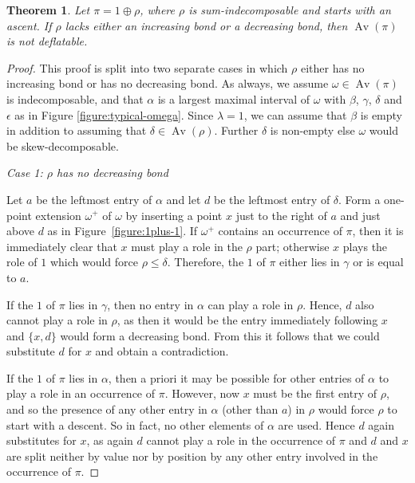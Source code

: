 \documentclass[10pt]{article}
\theoremstyle{plain}
\newtheorem{theorem}{Theorem}[section]
\newcommand{\Av}{\operatorname{Av}}
\begin{document}
\begin{theorem}
	\label{theorem:bonds-inc}
	Let $\pi = 1 \oplus \rho$, where $\rho$ is sum-indecomposable and starts with an ascent. If $\rho$ lacks either an increasing bond or a decreasing bond, then $\Av(\pi)$ is not deflatable.
\end{theorem}
\begin{proof}
	This proof is split into two separate cases in which $\rho$ either has no increasing bond or has no decreasing bond. As always, we assume $\omega \in \Av(\pi)$ is indecomposable, and that $\alpha$ is a largest maximal interval of $\omega$ with $\beta$, $\gamma$, $\delta$ and $\epsilon$ as in Figure \ref{figure:typical-omega}. Since $\lambda = 1$, we can assume that $\beta$ is empty in addition to assuming that $\delta \in \Av(\rho)$. Further $\delta$ is non-empty else $\omega$ would be skew-decomposable. 
	
	\bigskip
	
	\emph{Case 1: $\rho$ has no decreasing bond}
	
	Let $a$ be the leftmost entry of $\alpha$ and let $d$ be the leftmost entry of $\delta$. Form a one-point extension $\omega^+$ of $\omega$ by inserting a point $x$ just to the right of $a$ and just above $d$ as in Figure~\ref{figure:1plus-1}. If $\omega^+$ contains an occurrence of $\pi$, then it is immediately clear that $x$ must play a role in the $\rho$ part; otherwise $x$ plays the role of $1$ which would force $\rho \leq \delta$. Therefore, the $1$ of $\pi$ either lies in $\gamma$ or is equal to $a$.
	
	If the $1$ of $\pi$ lies in $\gamma$, then no entry in $\alpha$ can play a role in $\rho$. Hence, $d$ also cannot play a role in $\rho$, as then it would be the entry immediately following $x$ and $\{x,d\}$ would form a decreasing bond. From this it follows that we could substitute $d$ for $x$ and obtain a contradiction.
	
	If the $1$ of $\pi$ lies in $\alpha$, then a priori it may be possible for other entries of $\alpha$ to play a role in an occurrence of $\pi$. However, now $x$ must be the first entry of $\rho$, and so the presence of any other entry in $\alpha$ (other than $a$) in $\rho$ would force $\rho$ to start with a descent. So in fact, no other elements of $\alpha$ are used. Hence $d$ again substitutes for $x$, as again $d$ cannot play a role in the occurrence of $\pi$ and $d$ and $x$ are split neither by value nor by position by any other entry involved in the occurrence of $\pi$.
	

\end{proof}
\end{document}
